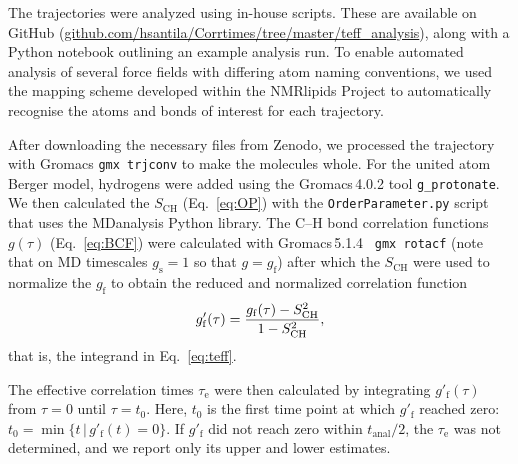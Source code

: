 \documentclass[journal=jcisd8,manuscript=article,layout=twocolumn]{achemso}
\begin{document}
The trajectories were analyzed using in-house scripts. These are available on GitHub (\url{github.com/hsantila/Corrtimes/tree/master/teff_analysis}), along with a Python notebook outlining an example analysis run.  To enable automated analysis of several force fields with differing atom naming conventions, we used the mapping scheme developed within the NMR\-lipids Project to automatically recognise the atoms and bonds of interest for each  trajectory.

After downloading the necessary files from Zenodo, we processed the trajectory with Gromacs \texttt{gmx trjconv} to make the molecules whole.
For the united atom Berger model, hydrogens were added using the Gromacs\,4.0.2 tool \texttt{g\_protonate}.
We then calculated the  $S_\mathrm{CH}$ (Eq.~\eqref{eq:OP}) with the \texttt{OrderParameter.py} script that uses the MDanalysis\cite{agrawal11,gowers16} Python library.
%
The \mbox{C--H} bond correlation functions
$g(\tau)$ (Eq.~\eqref{eq:BCF})
were calculated with Gromacs\,5.1.4~\cite{abraham2015gromacs} \texttt{gmx rotacf}
(note that on MD timescales \mbox{$g_\mathrm s =1$} so that $g = g_\mathrm{f}$)
after which the $S_\mathrm{CH}$ were used to
normalize the $g_\mathrm f$ to obtain %
the reduced and normalized correlation function
\begin{equation}
\label{eq:nBCF}
g'_{\mathrm{f}}(\tau)=\frac{g_{\mathrm{f}}(\tau)-S^{2}_{\rm{CH}}}{1-S^2_{\mathrm{CH}}},
\end{equation}
that is, the integrand in Eq.~\eqref{eq:teff}. 

The effective correlation times $\tau_\mathrm e$ were then calculated by integrating $g'_\mathrm f(\tau)$
from $\tau=0$ until $\tau = t_0$.
Here, $t_\mathrm 0$ is the first time point at which $g'_\mathrm f$ reached zero: $t_0 = \min
	\{
	t\,|\,g'_\mathrm f(t)=0
	\}
$.
%
If $g'_\mathrm f$ did not reach zero within 
$t_\mathrm{anal}/2$, the 
$\tau_\mathrm e$ was not determined,
and we report only its upper and lower estimates.
\end{document}
